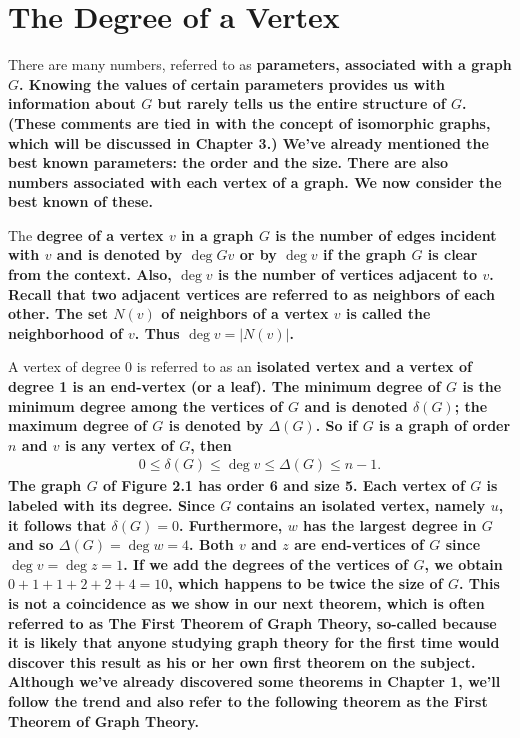 \section{The Degree of a Vertex}
There are many numbers, referred to as \bf{parameters}, associated with a graph $G$. Knowing the values of certain parameters provides us with information about $G$ but rarely tells us the entire structure of $G$. (These comments are tied in with the concept of isomorphic graphs, which will be discussed in Chapter 3.) We've already mentioned the best known parameters: the order and the size. There are also numbers associated with each vertex of a graph. We now consider the best known of these.

The \bf{degree of a vertex} $v$ in a graph $G$ is the number of edges incident with $v$ and is denoted by $\deg{G}{v}$ or by $\deg{}{v}$ if the graph $G$ is clear from the context. Also, $\deg{}{v}$ is the number of vertices adjacent to $v$. Recall that two adjacent vertices are referred to as neighbors of each other. The set $N(v)$ of neighbors of a vertex $v$ is called the \bf{neighborhood} of $v$. Thus $\deg{}{v} = |N(v)|$.

A vertex of degree 0 is referred to as an \bf{isolated vertex} and a vertex of degree 1 is an \bf{end-vertex} (or a \bf{leaf}). The \bf{minimum degree} of $G$ is the minimum degree among the vertices of $G$ and is denoted $\delta(G)$; the \bf{maximum degree} of $G$ is denoted by $\Delta(G)$. So if $G$ is a graph of order $n$ and $v$ is any vertex of $G$, then
\begin{align*}
0 \leq \delta(G) \leq \deg{}{v} \leq \Delta(G) \leq n-1.
\end{align*}
The graph $G$ of Figure 2.1 has order 6 and size 5. Each vertex of $G$ is labeled with its degree. Since $G$ contains an isolated vertex, namely $u$, it follows that $\delta(G) = 0$. Furthermore, $w$ has the largest degree in $G$ and so $\Delta(G) = \deg{}{w} = 4$. Both $v$ and $z$ are end-vertices of $G$ since $\deg{}{v} = \deg{}{z} = 1$. If we add the degrees of the vertices of $G$, we obtain $0+1+1+2+2+4=10$, which happens to be twice the size of $G$. This is not a coincidence as we show in our next theorem, which is often referred to as \bf{The First Theorem of Graph Theory}, so-called because it is likely that anyone studying graph theory for the first time would discover this result as his or her own first theorem on the subject. Although we've already discovered some theorems in Chapter 1, we'll follow the trend and also refer to the following theorem as the First Theorem of Graph Theory.

